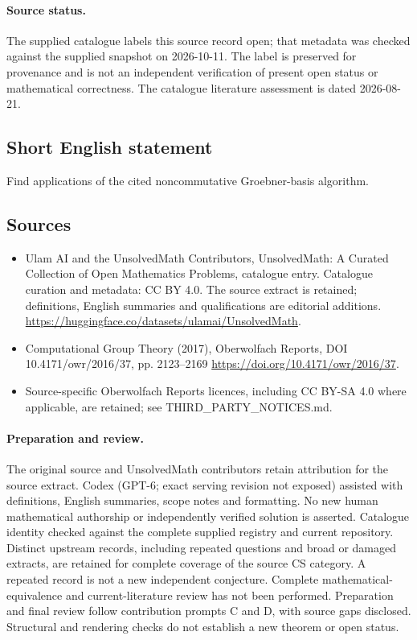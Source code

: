 \documentclass[11pt]{article}
\begin{document}
\paragraph{Source status.}
The supplied catalogue labels this source record open; that metadata was checked against the supplied snapshot on 2026-10-11. The label is preserved for provenance and is not an independent verification of present open status or mathematical correctness. The catalogue literature assessment is dated 2026-08-21.
\subsection{Short English statement}
Find applications of the cited noncommutative Groebner-basis algorithm.
\subsection{Sources}
\begin{itemize}
\item[S1] Ulam AI and the UnsolvedMath Contributors, UnsolvedMath: A Curated Collection of Open Mathematics Problems, catalogue entry. Catalogue curation and metadata: CC BY 4.0. The source extract is retained; definitions, English summaries and qualifications are editorial additions.
\url{https://huggingface.co/datasets/ulamai/UnsolvedMath}.
\item[S2] Computational Group Theory (2017), Oberwolfach Reports, DOI 10.4171/owr/2016/37, pp. 2123--2169
\url{https://doi.org/10.4171/owr/2016/37}.
\item Source-specific Oberwolfach Reports licences, including CC BY-SA 4.0 where applicable, are retained; see THIRD\_PARTY\_NOTICES.md.
\end{itemize}
\paragraph{Preparation and review.}
The original source and UnsolvedMath contributors retain attribution for the source extract. Codex (GPT-6; exact serving revision not exposed) assisted with definitions, English summaries, scope notes and formatting. No new human mathematical authorship or independently verified solution is asserted. Catalogue identity checked against the complete supplied registry and current repository. Distinct upstream records, including repeated questions and broad or damaged extracts, are retained for complete coverage of the source CS category. A repeated record is not a new independent conjecture. Complete mathematical-equivalence and current-literature review has not been performed. Preparation and final review follow contribution prompts C and D, with source gaps disclosed. Structural and rendering checks do not establish a new theorem or open status.
\label{end:statement}
\end{document}
